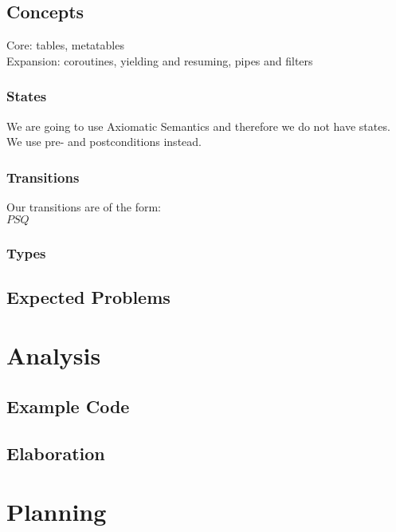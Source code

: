 \documentclass{article}
\begin{document}
\subsection{Concepts}
Core: tables, metatables\\
Expansion: coroutines, yielding and resuming, pipes and filters  
\subsubsection{States}
We are going to use Axiomatic Semantics and therefore we do not have states. We use pre- and postconditions instead.
\subsubsection{Transitions}
Our transitions are of the form:\\
${P}S{Q}$\\
\subsubsection{Types}

\subsection{Expected Problems}

\section{Analysis}
\subsection{Example Code}
\subsection{Elaboration}

\newpage
\appendix
\section{Planning}
\end{document}
